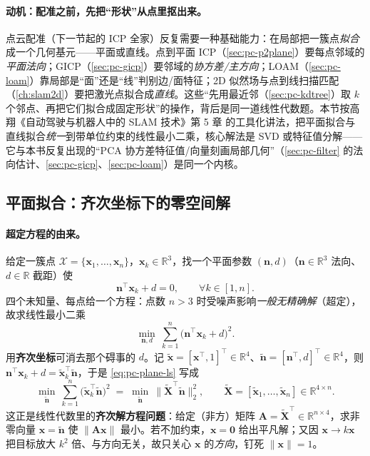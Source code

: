\paragraph{动机：配准之前，先把“形状”从点里抠出来。}
点云配准（下一节起的 ICP 全家）反复需要一种基础能力：在局部把一簇点\emph{拟合}成一个几何基元——平面或直线。点到平面 ICP（\cref{sec:pc-p2plane}）要每点邻域的\emph{平面法向}；GICP（\cref{sec:pc-gicp}）要邻域的\emph{协方差/主方向}；LOAM（\cref{sec:pc-loam}）靠局部是“面”还是“线”判别边/面特征；2D 似然场与点到线扫描匹配（\cref{ch:slam2d}）要把激光点拟合成\emph{直线}。这些“先用最近邻（\cref{sec:pc-kdtree}）取 $k$ 个邻点、再把它们拟合成固定形状”的操作，背后是同一道线性代数题。本节按高翔《自动驾驶与机器人中的 SLAM 技术》第 5 章\cite{gao2023slamad} 的工具化讲法，把平面拟合与直线拟合\emph{统一}到带单位约束的线性最小二乘，核心解法是 SVD 或特征值分解——它与本书反复出现的“PCA 协方差特征值/向量刻画局部几何”（\cref{sec:pc-filter} 的法向估计、\cref{sec:pc-gicp}、\cref{sec:pc-loam}）是同一个内核。

\subsection{平面拟合：齐次坐标下的零空间解}
\label{sec:pc-fit-plane}

\paragraph{超定方程的由来。}
给定一簇点 $\mathcal{X}=\{\mathbf{x}_1,\dots,\mathbf{x}_n\}$，$\mathbf{x}_k\in\mathbb{R}^3$，找一个平面参数 $(\mathbf{n},d)$（$\mathbf{n}\in\mathbb{R}^3$ 法向、$d\in\mathbb{R}$ 截距）使
\begin{equation}
  \mathbf{n}^\top\mathbf{x}_k+d=0,\qquad \forall k\in[1,n].
  \label{eq:pc-plane-eq}
\end{equation}
四个未知量、每点给一个方程：点数 $n>3$ 时受噪声影响\emph{一般无精确解}（超定），故求线性最小二乘
\begin{equation}
  \min_{\mathbf{n},d}\ \sum_{k=1}^{n}\big(\mathbf{n}^\top\mathbf{x}_k+d\big)^2 .
  \label{eq:pc-plane-ls}
\end{equation}
用\textbf{齐次坐标}可消去那个碍事的 $d$。记 $\tilde{\mathbf{x}}=[\mathbf{x}^\top,1]^\top\in\mathbb{R}^4$、$\tilde{\mathbf{n}}=[\mathbf{n}^\top,d]^\top\in\mathbb{R}^4$，则 $\mathbf{n}^\top\mathbf{x}_k+d=\tilde{\mathbf{x}}_k^\top\tilde{\mathbf{n}}$，于是 \cref{eq:pc-plane-ls} 写成
\begin{equation}
  \min_{\tilde{\mathbf{n}}}\ \sum_{k=1}^{n}\big(\tilde{\mathbf{x}}_k^\top\tilde{\mathbf{n}}\big)^2
  \;=\;\min_{\tilde{\mathbf{n}}}\ \big\|\tilde{\mathbf{X}}^\top\tilde{\mathbf{n}}\big\|_2^2,
  \qquad \tilde{\mathbf{X}}=[\tilde{\mathbf{x}}_1,\dots,\tilde{\mathbf{x}}_n]\in\mathbb{R}^{4\times n}.
  \label{eq:pc-plane-Axb}
\end{equation}
这正是线性代数里的\textbf{齐次解方程问题}：给定（非方）矩阵 $\mathbf{A}=\tilde{\mathbf{X}}^\top\in\mathbb{R}^{n\times4}$，求非零向量 $\mathbf{x}=\tilde{\mathbf{n}}$ 使 $\|\mathbf{A}\mathbf{x}\|$ 最小。若不加约束，$\mathbf{x}=\mathbf{0}$ 给出平凡解；又因 $\mathbf{x}\to k\mathbf{x}$ 把目标放大 $k^2$ 倍、与方向无关，故只关心 $\mathbf{x}$ 的\emph{方向}，钉死 $\|\mathbf{x}\|=1$。

